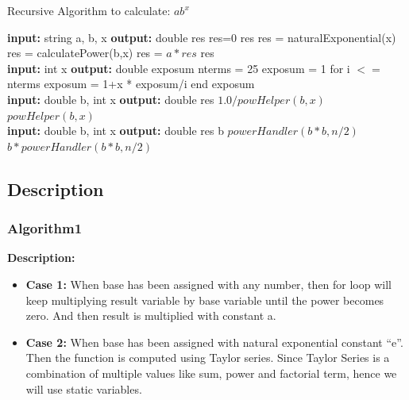 \documentclass[a4paper,12pt]{report}
\begin{document}
\begin{algorithm}
\caption{Recursive Algorithm to calculate: $ab^x$ }
\begin{algorithmic}
\State \textbf{input: } string a, b, x
\State \textbf{output: } double res
\State  res=0
    \State \Return res
    \State res = naturalExponential(x)
\Else
 \State res = calculatePower(b,x)
\EndIf
\State res = $a * res$
\State \Return res
\EndProcedure
\\
\State \textbf{input: } int x
\State \textbf{output: } double exposum
\State nterms = 25
\State exposum = 1
\State for i $<=$ nterms
    \State exposum = 1+x * exposum/i
    \State end
\State \Return exposum
\EndProcedure
\\
\State \textbf{input: } double b, int x
\State \textbf{output: } double res
\State \Return $1.0/powHelper(b,x)$
   \EndIf
\State \Return $powHelper(b,x)$
\EndProcedure
\\
\State \textbf{input: } double b, int x
\State \textbf{output: } double res
\EndIf
{}
    \Return b
\EndIf
{}
\State \Return $powerHandler(b*b,  n/2)$
\Else
\State \Return $b * powerHandler(b*b,  n/2)$
\EndIf
\EndProcedure
\end{algorithmic}

\end{algorithm}

\pagebreak

\subsection{Description}

\subsubsection{Algorithm1}

\textbf{ Description: }
\begin{itemize}
    \item \textbf{Case 1:} When base has been assigned with any number, then for  loop will keep multiplying result variable by base variable until the power becomes zero. And then result is multiplied with constant a.
    \item \textbf{Case 2:} When base has been assigned with natural exponential constant “e”. Then the function is computed using Taylor series. Since Taylor Series is a combination of multiple values like sum, power and factorial term, hence we will use static variables.\cite{b7}
\end{itemize}
\end{document}
